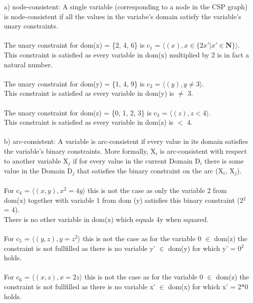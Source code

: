 \documentclass[12pt]{article}
\begin{document}
a) node-consistent: A single variable (corresponding to a node in the CSP graph) is node-consistent if all the values in the variabe's domain satisfy the variable's unary constraints. \\ \\
The unary constraint for dom(x) = \{2, 4, 6\} is c$_{1}$ = $\langle (x), x \in \{2x' | x' \in \mathbf{N}\} \rangle$. \\
This constraint is satisfied as every variable in dom(x) multiplied by 2 is in fact a natural number.\\ \\
The unary constraint for dom(y) = \{1, 4, 9\} is c$_{2}$ = $\langle (y), y \neq 3 \rangle$.\\
This constraint is satisfied as every variable in dom(y) is $\neq$ 3.\\ \\
The unary constraint for dom(z) = \{0, 1, 2, 3\} is c$_{3}$ = $\langle (z), z < 4 \rangle$.\\
This constraint is satisfied as every variable in dom(z) is $<$ 4.\\ \\
b) arc-consistent: A variable is arc-consistent if every value in its domain satisfies the variable's binary constraints. More formally, X$_{i}$ is arc-consistent with respect to another variable X$_{j}$ if for every value in the current Domain D$_{i}$ there is some value in the Domain D$_{j}$ that satisfies the binary constraint on the arc (X$_{i}$, X$_{j}$).\\ \\
For c$_{4}$ = $\langle (x,y), x^{2} = 4y \rangle$ this is not the case as only the variable 2 from dom(x) together with variable 1 from dom (y) satisfies this binary constraint (2$^{2}$ = 4).\\
There is no other variable in dom(x) which equals 4y when squared.\\ \\
For c$_{5}$ = $\langle (y,z), y = z^{2} \rangle$ this is not the case as for the variable 0 $\in$ dom(z) the constraint is not fullfilled as there is no variable y' $\in$ dom(y) for which y' = 0$^{2}$ holds.\\ \\
For c$_{6}$ = $\langle (x,z), x = 2z\rangle$ this is not the case as for the variable 0 $\in$ dom(z) the constraint is not fullfilled as there is no variable x' $\in$ dom(x) for which x' = 2*0 holds.\\ \\
\end{document}
